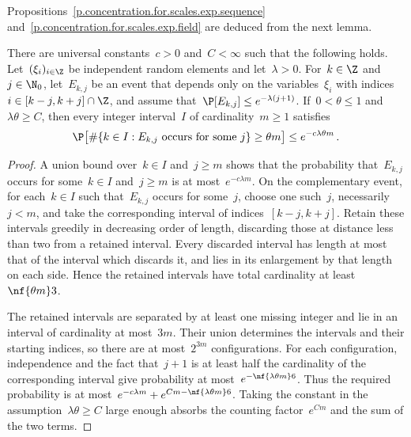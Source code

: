 \documentclass[11pt]{amsart}
\begin{document}
Propositions~\ref{p.concentration.for.scales.exp.sequence} and~\ref{p.concentration.for.scales.exp.field} are deduced from the next lemma.

\begin{lemma}
\label{l.concentration.rare.intervals}
There are universal constants~$c>0$ and~$C<\infty$ such that the following holds. Let~$(\xi_i)_{i\in\Z}$ be independent random elements and let~$\lambda>0$. For~$k\in\Z$ and~$j\in\N_0$, let~$E_{k,j}$ be an event that depends only on the variables~$\xi_i$ with indices~$i\in[k-j,k+j]\cap\Z$, and assume that~$\P[E_{k,j}]\leq e^{-\lambda(j+1)}$. If~$0<\theta\leq1$ and~$\lambda\theta\geq C$, then every integer interval~$I$ of cardinality~$m\geq1$ satisfies
\begin{equation*}
	\P\bigl[\#\{k\in I:E_{k,j}\text{ occurs for some }j\}\geq\theta m\bigr]
	\leq e^{-c\lambda\theta m}\,.
\end{equation*}
\end{lemma}

\begin{proof}
A union bound over~$k\in I$ and~$j\geq m$ shows that the probability that~$E_{k,j}$ occurs for some~$k\in I$ and~$j\geq m$ is at most~$e^{-c\lambda m}$. On the complementary event, for each~$k\in I$ such that~$E_{k,j}$ occurs for some~$j$, choose one such~$j$, necessarily~$j<m$, and take the corresponding interval of indices~$[k-j,k+j]$. Retain these intervals greedily in decreasing order of length, discarding those at distance less than two from a retained interval. Every discarded interval has length at most that of the interval which discards it, and lies in its enlargement by that length on each side. Hence the retained intervals have total cardinality at least~$\nf{\theta m}3$.

\smallskip

The retained intervals are separated by at least one missing integer and lie in an interval of cardinality at most~$3m$. Their union determines the intervals and their starting indices, so there are at most~$2^{3m}$ configurations. For each configuration, independence and the fact that~$j+1$ is at least half the cardinality of the corresponding interval give probability at most~$e^{-\nf{\lambda\theta m}6}$. Thus the required probability is at most~$e^{-c\lambda m}+e^{Cm-\nf{\lambda\theta m}6}$. Taking the constant in the assumption~$\lambda\theta\geq C$ large enough absorbs the counting factor~$e^{Cm}$ and the sum of the two terms.
\end{proof}
\end{document}
